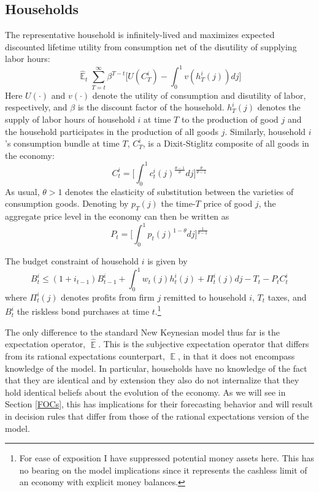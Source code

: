 \documentclass[11pt]{article}
\renewcommand{\[}{\begin{equation}}
\renewcommand{\]}{\end{equation}}
\DeclareMathOperator{\E}{\mathbb{E}}
\begin{document}
\subsection{Households}
The representative household is infinitely-lived and maximizes expected discounted lifetime utility from consumption net of the disutility of supplying labor hours:
\begin{equation}
\hat{\E}_t\sum^{\infty}_{T=t}\beta^{T-t} \bigg[ U(C^i_T) - \int_0^1 v(h^i_T(j)) dj \bigg]
\label{lifetime_U}
\end{equation}
Here $U(\cdot)$ and $v(\cdot)$ denote the utility of consumption and disutility of labor, respectively, and $\beta$ is the discount factor of the household. $h^i_T(j)$ denotes the supply of labor hours of household $i$ at time $T$ to the production of good $j$ and the household participates in the production of all goods $j$. Similarly, household $i$'s consumption bundle at time $T$,  $C_T^i$, is a Dixit-Stiglitz composite of all goods in the economy:
\begin{equation}
C^i_t =  \bigg[  \int_0^1 c^i_t(j)^{\frac{\theta-1}{\theta}} dj \bigg]^{\frac{\theta}{\theta-1}}\label{dixit}
\end{equation}
As usual, $\theta>1$ denotes the elasticity of substitution between the varieties of consumption goods. Denoting by $p_T(j)$ the time-$T$ price of good $j$, the aggregate price level in the economy can then be written as
\begin{equation}
P_t =  \bigg[  \int_0^1 p_t(j)^{1-\theta} dj \bigg]^{\frac{1}{\theta-1}}
\label{agg_price}
\end{equation}

The budget constraint of household $i$ is given by
\begin{equation}
 B^i_t \leq (1+i_{t-1})B^i_{t-1} + \int_0^1 w_t(j)h^i_t(j) + \Pi_t^i(j)  dj-T_t -P_tC^i_t
 \label{BC}
\end{equation}
where $\Pi_t^i(j)$ denotes profits from firm $j$ remitted to household $i$, $T_t$ taxes, and $B^i_t$ the riskless bond purchases at time $t$.\footnote{For ease of exposition I have suppressed potential money assets here. This has no bearing on the model implications since it represents the cashless limit of an economy with explicit money balances.}

The only difference to the standard New Keynesian model thus far is the expectation operator, $\hat{\E}$. This is the subjective expectation operator that differs from its rational expectations counterpart, $\E$, in that it does not encompass knowledge of the model. In particular, households have no knowledge of the fact that they are identical and by extension they also do not internalize that they hold identical beliefs about the evolution of the economy. As we will see in Section \ref{FOCs}, this has implications for their forecasting behavior and will result in decision rules that differ from those of the rational expectations version of the model.
\end{document}

